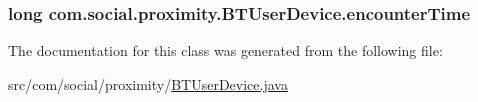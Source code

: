 \subsubsection[{encounter\+Time}]{\setlength{\rightskip}{0pt plus 5cm}long com.\+social.\+proximity.\+B\+T\+User\+Device.\+encounter\+Time\hspace{0.3cm}{\ttfamily [private]}}\label{classcom_1_1social_1_1proximity_1_1_b_t_user_device_a59404150e780de3e55d6174cbfa850f3}


The documentation for this class was generated from the following file\+:\begin{DoxyCompactItemize}
\item 
src/com/social/proximity/\hyperlink{_b_t_user_device_8java}{B\+T\+User\+Device.\+java}\end{DoxyCompactItemize}
